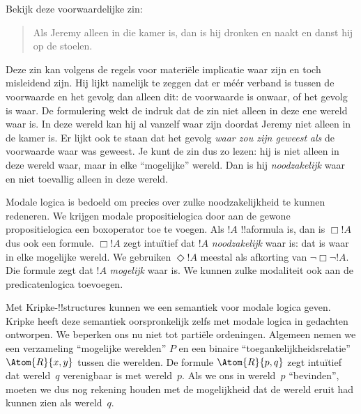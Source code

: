 \documentclass[../../../include/open-logic-section]{subfiles}
\begin{document}


Bekijk deze voorwaardelijke zin:
\begin{quote}
  Als Jeremy alleen in die kamer is, dan is hij dronken en naakt en
  danst hij op de stoelen.
\end{quote}
Deze zin kan volgens de regels voor materiële implicatie waar zijn en toch
misleidend zijn. Hij lijkt namelijk te zeggen dat er méér verband is tussen de
voorwaarde en het gevolg dan alleen dit: de voorwaarde is onwaar, of het gevolg
is waar. De formulering wekt de indruk dat de zin niet alleen in deze ene wereld
waar is. In deze wereld kan hij al vanzelf waar zijn doordat Jeremy niet alleen
in de kamer is. Er lijkt ook te staan dat het gevolg \emph{waar zou zijn geweest}
\emph{als} de voorwaarde waar was geweest. Je kunt de zin dus zo lezen: hij is
niet alleen in deze wereld waar, maar in elke ``mogelijke'' wereld. Dan is hij
\emph{noodzakelijk} waar en niet toevallig alleen in deze wereld.

Modale logica is bedoeld om precies over zulke noodzakelijkheid te kunnen
redeneren. We krijgen modale propositielogica door aan de gewone
propositielogica een boxoperator toe te voegen. Als $!A$ !!a{formula} is, dan is
$\Box !A$ dus ook een formule. $\Box !A$ zegt intuïtief dat $!A$
\emph{noodzakelijk} waar is: dat is waar in elke mogelijke wereld. We gebruiken
$\Diamond !A$ meestal als afkorting van $\lnot \Box \lnot !A$. Die formule zegt
dat $!A$ \emph{mogelijk} waar is. We kunnen zulke modaliteit ook aan de
predicatenlogica toevoegen.

Met Kripke-!!{structure}s kunnen we een semantiek voor modale logica geven.
Kripke heeft deze semantiek oorspronkelijk zelfs met modale logica in gedachten
ontworpen. We beperken ons nu niet tot partiële ordeningen. Algemeen nemen we
een verzameling ``mogelijke werelden'' $P$ en een binaire
``toegankelijkheidsrelatie'' $\Atom{R}{x,y}$ tussen die werelden. De formule
$\Atom{R}{p,q}$ zegt intuïtief dat wereld~$q$ verenigbaar is met wereld~$p$.
Als we ons in wereld~$p$ ``bevinden'', moeten we dus nog rekening houden met de
mogelijkheid dat de wereld eruit had kunnen zien als wereld~$q$.
\end{document}
